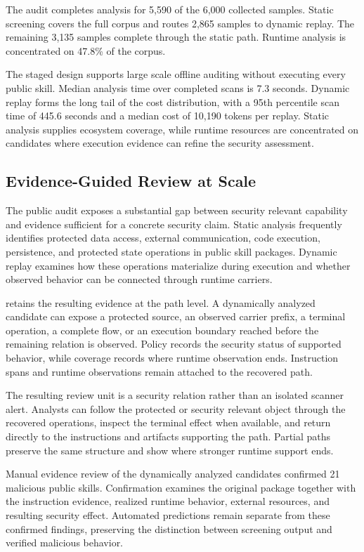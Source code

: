 The audit completes analysis for 5,590 of the 6,000 collected samples.
Static screening covers the full corpus and routes 2,865 samples to dynamic
replay. The remaining 3,135 samples complete through the static path. Runtime
analysis is concentrated on 47.8\% of the corpus.

The staged design supports large scale offline auditing without executing
every public skill. Median analysis time over completed scans is 7.3 seconds.
Dynamic replay forms the long tail of the cost distribution, with a
95th percentile scan time of 445.6 seconds and a median cost of 10,190 tokens
per replay. Static analysis supplies ecosystem coverage, while runtime
resources are concentrated on candidates where execution evidence can refine
the security assessment.


\subsection{Evidence-Guided Review at Scale}
\label{sec:realworld-findings}

The public audit exposes a substantial gap between security relevant capability
and evidence sufficient for a concrete security claim. Static analysis
frequently identifies protected data access, external communication, code
execution, persistence, and protected state operations in public skill
packages. Dynamic replay examines how these operations materialize during
execution and whether observed behavior can be connected through runtime
carriers.

\system retains the resulting evidence at the path level. A dynamically
analyzed candidate can expose a protected source, an observed carrier prefix,
a terminal operation, a complete flow, or an execution boundary reached before
the remaining relation is observed. Policy records the security status of
supported behavior, while coverage records where runtime observation ends.
Instruction spans and runtime observations remain attached to the recovered
path.

The resulting review unit is a security relation rather than an isolated
scanner alert. Analysts can follow the protected or security relevant object
through the recovered operations, inspect the terminal effect when available,
and return directly to the instructions and artifacts supporting the path.
Partial paths preserve the same structure and show where stronger runtime
support ends.

Manual evidence review of the dynamically analyzed candidates confirmed
21 malicious public skills. Confirmation examines the original package
together with the instruction evidence, realized runtime behavior, external
resources, and resulting security effect. Automated predictions remain
separate from these confirmed findings, preserving the distinction between
screening output and verified malicious behavior.

